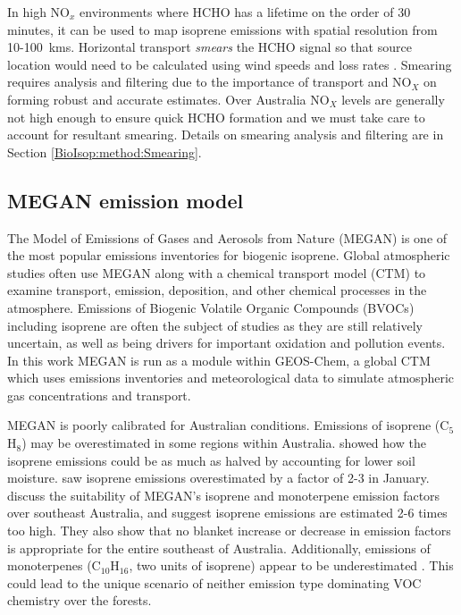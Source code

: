       In high NO$_x$ environments where HCHO has a lifetime on the order of 30 minutes, it can be used to map isoprene emissions with spatial resolution from 10-100~kms.
      Horizontal transport \textit{smears} the HCHO signal so that source location would need to be calculated using wind speeds and loss rates \parencite{Palmer2001,Palmer2003}.
      Smearing requires analysis and filtering due to the importance of transport and NO$_X$ on forming robust and accurate estimates.
      Over Australia NO$_X$ levels are generally not high enough to ensure quick HCHO formation and we must take care to account for resultant smearing.
      Details on smearing analysis and filtering are in Section \ref{BioIsop:method:Smearing}.
    
      
  \subsection{MEGAN emission model}
    The Model of Emissions of Gases and Aerosols from Nature (MEGAN) is one of the most popular emissions inventories for biogenic isoprene.
    Global atmospheric studies often use MEGAN along with a chemical transport model (CTM) to examine transport, emission, deposition, and other chemical processes in the atmosphere.
    Emissions of Biogenic Volatile Organic Compounds (BVOCs) including isoprene are often the subject of studies as they are still relatively uncertain, as well as being drivers for important oxidation and pollution events.
    In this work MEGAN is run as a module within GEOS-Chem, a global CTM which uses emissions inventories and meteorological data to simulate atmospheric gas concentrations and transport.
    
    MEGAN is poorly calibrated for Australian conditions.
    Emissions of isoprene (C$_5$H$_8$) may be overestimated in some regions within Australia.
    \textcite{Sindelarova2014} showed how the isoprene emissions could be as much as halved by accounting for lower soil moisture.
    \textcite{Stavrakou2015} saw isoprene emissions overestimated by a factor of 2-3 in January.
    \textcite{Emmerson2016} discuss the suitability of MEGAN's isoprene and monoterpene emission factors over southeast Australia, and suggest isoprene emissions are estimated 2-6 times too high.
    They also show that no blanket increase or decrease in emission factors is appropriate for the entire southeast of Australia.
    Additionally, emissions of monoterpenes (C$_{10}$H$_{16}$, two units of isoprene) appear to be underestimated \parencite{Emmerson2016}.
    This could lead to the unique scenario of neither emission type dominating VOC chemistry over the forests.
  
